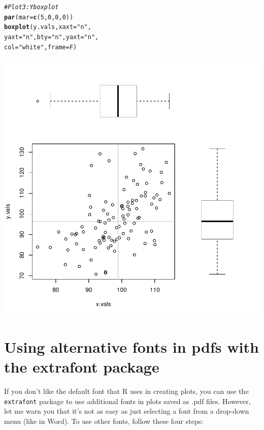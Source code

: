 \documentclass{tufte-book}\usepackage[]{graphicx}\usepackage[]{color}
\makeatletter
\def\maxwidth{ %
  \ifdim\Gin@nat@width>\linewidth
    \linewidth
  \else
    \Gin@nat@width
  \fi
}
\newcommand{\hlnum}[1]{\textcolor[rgb]{0.686,0.059,0.569}{#1}}%
\newcommand{\hlstr}[1]{\textcolor[rgb]{0.192,0.494,0.8}{#1}}%
\newcommand{\hlcom}[1]{\textcolor[rgb]{0.678,0.584,0.686}{\textit{#1}}}%
\newcommand{\hlstd}[1]{\textcolor[rgb]{0.345,0.345,0.345}{#1}}%
\newcommand{\hlkwc}[1]{\textcolor[rgb]{0.333,0.667,0.333}{#1}}%
\newcommand{\hlkwd}[1]{\textcolor[rgb]{0.737,0.353,0.396}{\textbf{#1}}}%
\newenvironment{kframe}{%
 \def\at@end@of@kframe{}%
 \ifinner\ifhmode%
  \def\at@end@of@kframe{\end{minipage}}%
  \begin{minipage}{\columnwidth}%
 \fi\fi%
 \def\FrameCommand##1{\hskip\@totalleftmargin \hskip-\fboxsep
 \colorbox{shadecolor}{##1}\hskip-\fboxsep
     \hskip-\linewidth \hskip-\@totalleftmargin \hskip\columnwidth}%
 \MakeFramed {\advance\hsize-\width
   \@totalleftmargin\z@ \linewidth\hsize
   \@setminipage}}%
 {\par\unskip\endMakeFramed%
 \at@end@of@kframe}
\newenvironment{knitrout}{}{} %
\makeatother
\begin{document}
\begin{footnotesize}
\begin{footnotesize}
\begin{knitrout}
\begin{kframe}
\begin{alltt}
\hlcom{# Plot 3: Y boxplot}
\hlkwd{par}\hlstd{(}\hlkwc{mar} \hlstd{=} \hlkwd{c}\hlstd{(}\hlnum{5}\hlstd{,} \hlnum{0}\hlstd{,} \hlnum{0}\hlstd{,} \hlnum{0}\hlstd{))}
\hlkwd{boxplot}\hlstd{(y.vals,} \hlkwc{xaxt} \hlstd{=} \hlstr{"n"}\hlstd{,}
        \hlkwc{yaxt} \hlstd{=} \hlstr{"n"}\hlstd{,} \hlkwc{bty} \hlstd{=} \hlstr{"n"}\hlstd{,} \hlkwc{yaxt} \hlstd{=} \hlstr{"n"}\hlstd{,}
        \hlkwc{col} \hlstd{=} \hlstr{"white"}\hlstd{,} \hlkwc{frame} \hlstd{= F)}
\end{alltt}
\end{kframe}
\includegraphics[width=\maxwidth]{figure/unnamed-chunk-186-1} 

\end{knitrout}
\end{footnotesize}


\section{Using alternative fonts in pdfs with the extrafont package}

If you don't like the default font that R uses in creating plots, you can use the \texttt{extrafont} package to use additional fonts in plots saved as .pdf files. However, let me warn you that it's not as easy as just selecting a font from a drop-down menu (like in Word). To use other fonts, follow these four steps:


\end{footnotesize}
\end{document}
